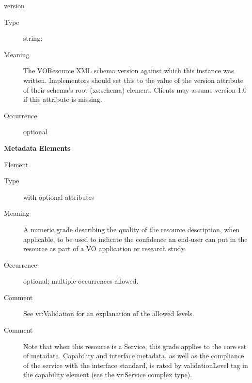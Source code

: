 \documentclass[11pt,a4paper]{ivoa}
\begin{document}
\begin{generated}
\begin{bigdescription}
\begin{description}
\begin{longtermsdescription}
\end{longtermsdescription}
\end{description}
\item[version]
\begin{description}
\item[Type] string: 
\item[Meaning]
               The VOResource XML schema version
               against which this instance was written.
               Implementors should set this to the value of the version
               attribute of their schema's root (xs:schema) element.
               Clients may assume version 1.0 if this attribute is
               missing.

\item[Occurrence] optional
\end{description}


\end{bigdescription}\endgroup



\vspace{0.5ex}\noindent\textbf{ Metadata Elements}

\begingroup\small\begin{bigdescription}\item[Element \xmlel{validationLevel}]
\begin{description}
\item[Type]  with optional attributes
\item[Meaning]
                  A numeric grade describing the quality of the
                  resource description, when applicable,
                  to be used to indicate the confidence an end-user
                  can put in the resource as part of a VO application
                  or research study.

\item[Occurrence] optional; multiple occurrences allowed.
\item[Comment]
                  See vr:Validation for an explanation of the
                  allowed levels.

\item[Comment]
                  Note that when this resource is a Service, this
                  grade applies to the core set of metadata.
                  Capability and interface metadata, as well as the
                  compliance of the service with the interface
                  standard, is rated by validationLevel tag in the
                  capability element (see the vr:Service complex
                  type).



\end{description}
\end{bigdescription}
\end{generated}
\end{document}
